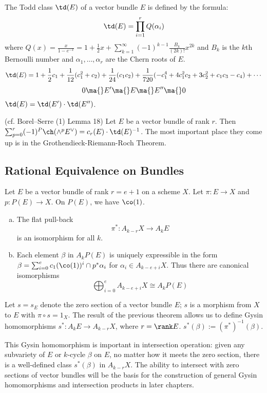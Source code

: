 \begin{ex}
The Todd class $\td(E)$ of a vector bundle $E$ is defined by the formula:
	\[
	\td(E)=\prod_{i=1}^r Q(\alpha_i)
	\]
where $Q(x)=\frac{x}{1-e^{-x}}= 1 + \frac{1}{2}x+ \sum_{k=1}^\infty (-1)^{k-1} \frac{B_k}{(2k)!} x^{2k}$ and $B_k$ is the $k$th Bernoulli number and $\alpha_1,\ldots,\alpha_r$ are the Chern roots of $E$.
	\[
	\td(E)= 1+\frac{1}{2} c_1 + \frac{1}{12}(c_1^2+c_2) + \frac{1}{24}(c_1c_2) + \frac{1}{720} (-c_1^4 + 4c_1^2c_2+ 3c_2^2+c_1c_3-c_4) + \cdots
	\]
	\[
	0 \ma{} E' \ma{} E \ma{} E'' \ma{} 0
	\]
$\td(E)=\td(E') \cdot \td(E'')$.
\end{ex}

\begin{ex}
(cf. Borel--Serre (1) Lemma 18) Let $E$ be a vector bundle of rank $r$. Then $\sum_{p=0}^r (-1)^P \ch(\wedge^p E^\vee)=c_r(E) \cdot \td(E)^{-1}$. The most important place they come up is in the Grothendieck-Riemann-Roch Theorem. 
\end{ex}





\subsection{Rational Equivalence on Bundles}

Let $E$ be a vector bundle of rank $r=e+1$ on a scheme $X$. Let $\pi: E \to X$ and $p: P(E) \to X$. On $P(E)$, we have $\co(1)$.

\begin{thmm}
\begin{enumerate}[(a)]
\item The flat pull-back	
	\[
	\pi^*: A_{k-r} X \to A_kE
	\]
is an isomorphism for all $k$. 
\item Each element $\beta$ in $A_kP(E)$ is uniquely expressible in the form $\beta=\sum_{i=0}^e c_1(\co(1))^i \cap p^* \alpha_i$ for $\alpha_i \in A_{k-e+i}X$. Thus there are canonical isomorphisms 
	\[
	\bigoplus_{i=0}^e A_{k-e+i} X \cong A_kP(E)
	\]
\end{enumerate}
\end{thmm}

\begin{dfn}
Let $s=s_E$ denote the zero section of a vector bundle $E$; $s$ is a morphism from $X$ to $E$ with $\pi \circ s=1_X$. The result of the previous theorem allows us to define Gysin homomorphisms $s^*: A_k E \to A_{k-r}X$, where $r= \rank E$. $s^*(\beta):=(\pi^*)^{-1}(\beta)$. 
\end{dfn}

This Gysin homomorphism is important in intersection operation: given any subvariety of $E$ or $k$-cycle $\beta$ on $E$, no matter how it meets the zero section, there is a well-defined class $s^*(\beta)$ in $A_{k-r}X$. The ability to intersect with zero sections of vector bundles will be the basis for the construction of general Gysin homomorphisms and intersection products in later chapters. 